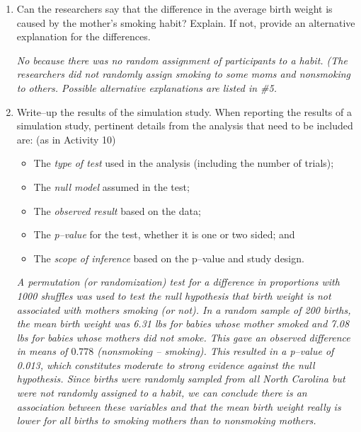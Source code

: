 \begin{enumerate}
\begin{key}
  {\it  Yes because this is a random sample of all NC births, no
    because we didn't look at other states.}
\end{key}


\item Can the researchers say that the difference in the average
  birth weight is caused by the mother's smoking habit?  Explain. If
  not, provide an alternative 
  explanation for the differences. 
\begin{students}
 \vspace{2cm}
\end{students}

\begin{key}
  {\it   No because there was no random assignment of participants to
    a habit.  (The researchers did not randomly assign smoking to some
    moms and nonsmoking to others. Possible alternative explanations
    are listed in \#5.} 
\end{key}


\item  Write--up the results of the simulation study. When reporting
  the results of a simulation study, pertinent details from the
  analysis that need to be included are: (as in Activity 10)
  \begin{itemize}
  \item The {\it type of test} used in the analysis (including the number of trials);
  \item The {\it null model} assumed in the test;
  \item The {\it observed result} based on the data;
  \item The {\it p--value} for the test, whether it is one or two sided; and
  \item The {\it scope of inference} based on the p--value and study design.
  \end{itemize}
\begin{students}
\newpage
\end{students}
\begin{key}
  {\it A permutation (or randomization) test for a difference in
    proportions with 1000 shuffles was used to test the null
    hypothesis that birth weight is not associated with mothers
    smoking (or not).  In a random sample of 200 births, the mean
    birth weight was 6.31 lbs for babies whose mother smoked and 7.08
    lbs for babies whose mothers did not smoke. This gave an observed
    difference in means of $0.778$ (nonsmoking -- smoking).  This
    resulted in a p--value of 0.013, which constitutes moderate to
    strong evidence against the null hypothesis.  Since births were
    randomly sampled from all North Carolina but were not randomly
    assigned to a habit, we can conclude there is an association
    between these variables and that the mean birth weight really is
    lower for all births to smoking mothers than to nonsmoking
    mothers. }
\end{key}
\ 
\vspace*{\fill}


\end{enumerate}
